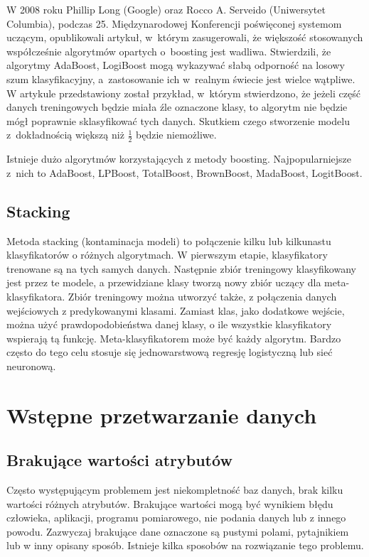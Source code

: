 W 2008 roku Phillip Long (Google) oraz Rocco A. Serveido (Uniwersytet Columbia), podczas 25. Międzynarodowej Konferencji poświęconej systemom uczącym, opublikowali artykuł, w którym zasugerowali, że większość stosowanych współcześnie algorytmów opartych o boosting jest wadliwa. Stwierdzili, że algorytmy AdaBoost, LogiBoost mogą wykazywać słabą odporność na losowy szum klasyfikacyjny, a zastosowanie ich w realnym świecie jest wielce wątpliwe. W artykule przedstawiony został przykład, w którym stwierdzono, że jeżeli część danych treningowych będzie miała źle oznaczone klasy, to algorytm nie będzie mógł poprawnie sklasyfikować tych danych. Skutkiem czego stworzenie modelu z dokładnością większą niż $\frac{1}{2}$ będzie niemożliwe. \par
Istnieje dużo algorytmów korzystających z metody boosting. Najpopularniejsze z nich to AdaBoost, LPBoost, TotalBoost, BrownBoost, MadaBoost, LogitBoost.
\subsection{Stacking}
Metoda stacking (kontaminacja modeli) to połączenie kilku lub kilkunastu klasyfikatorów o różnych algorytmach. W pierwszym etapie, klasyfikatory trenowane są na tych samych danych. Następnie zbiór treningowy klasyfikowany jest przez te modele, a przewidziane klasy tworzą nowy zbiór uczący dla meta-klasyfikatora. Zbiór treningowy można utworzyć także, z połączenia danych wejściowych z predykowanymi klasami. Zamiast klas, jako dodatkowe wejście, można użyć prawdopodobieństwa danej klasy, o ile wszystkie klasyfikatory wspierają tą funkcję. Meta-klasyfikatorem może być każdy algorytm. Bardzo często do tego celu stosuje się jednowarstwową regresję logistyczną lub sieć neuronową. 
\section{Wstępne przetwarzanie danych}
\subsection{Brakujące wartości atrybutów}
Często występującym problemem jest niekompletność baz danych, brak kilku wartości różnych atrybutów. Brakujące wartości mogą być wynikiem błędu człowieka, aplikacji, programu pomiarowego, nie podania danych lub z innego powodu. Zazwyczaj brakujące dane oznaczone są pustymi polami, pytajnikiem lub w inny opisany sposób. Istnieje kilka sposobów na rozwiązanie tego problemu.
